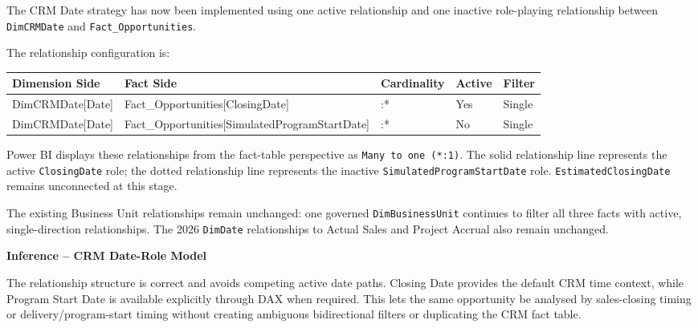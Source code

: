 \documentclass[11pt,a4paper]{article}
\begin{document}
The CRM Date strategy has now been implemented using one active relationship
and one inactive role-playing relationship between \texttt{DimCRMDate} and
\texttt{Fact\_Opportunities}.

The relationship configuration is:

\begin{tabularx}{\textwidth}{
    >{\ttfamily\raggedright\arraybackslash}p{4.3cm}
    >{\ttfamily\raggedright\arraybackslash}p{4.8cm}
    >{\centering\arraybackslash}p{1.5cm}
    >{\centering\arraybackslash}p{1.5cm}
    X
}

\toprule

Dimension Side
&
Fact Side
&
Cardinality
&
Active
&
Filter
\\

\midrule

DimCRMDate[Date]
&
Fact\_Opportunities[ClosingDate]
&
1:*
&
Yes
&
Single
\\

DimCRMDate[Date]
&
Fact\_Opportunities[SimulatedProgramStartDate]
&
1:*
&
No
&
Single
\\

\bottomrule

\end{tabularx}

Power BI displays these relationships from the fact-table perspective as
\texttt{Many to one (*:1)}. The solid relationship line represents the active
\texttt{ClosingDate} role; the dotted relationship line represents the inactive
\texttt{SimulatedProgramStartDate} role. \texttt{EstimatedClosingDate} remains
unconnected at this stage.

The existing Business Unit relationships remain unchanged: one governed
\texttt{DimBusinessUnit} continues to filter all three facts with active,
single-direction relationships. The 2026 \texttt{DimDate} relationships to
Actual Sales and Project Accrual also remain unchanged.

\begin{inferencebox}

\textbf{Inference -- CRM Date-Role Model}

The relationship structure is correct and avoids competing active date paths.
Closing Date provides the default CRM time context, while Program Start Date is
available explicitly through DAX when required. This lets the same opportunity
be analysed by sales-closing timing or delivery/program-start timing without
creating ambiguous bidirectional filters or duplicating the CRM fact table.

\end{inferencebox}
\end{document}
